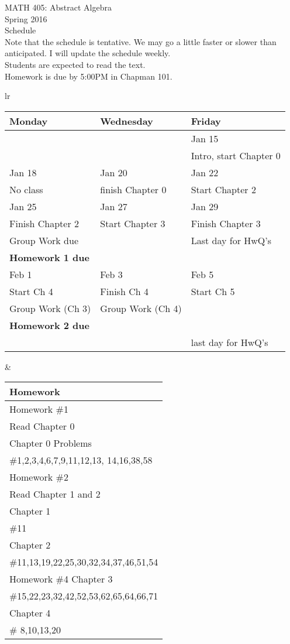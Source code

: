 \documentclass[11pt]{article}
\begin{document}
MATH 405:  Abstract Algebra \\ Spring 2016 \\ Schedule\\

Note that the schedule is tentative. We may go a little faster or slower than anticipated. I will update the schedule weekly.\\

Students are expected to read the text. \\

Homework is due by 5:00PM in Chapman 101.\\

\hrulefill


\begin{tabular}{lr}
\begin{tabular}{|l|l|l|}
\hline
Monday & Wednesday & Friday \\
\hline \hline
&&Jan 15\\
&&Intro, start Chapter 0\\
\hline
Jan 18 & Jan 20 & Jan 22 \\
No class &finish Chapter 0  & Start Chapter 2\\
\hline
Jan 25& Jan 27 & Jan 29 \\
Finish Chapter 2 &Start Chapter 3&Finish Chapter 3\\
Group Work due &&Last day for HwQ's\\
\textbf{Homework 1 due}&&\\
\hline
Feb 1 & Feb 3 & Feb 5 \\
Start Ch 4 & Finish Ch 4& Start Ch 5\\
Group Work (Ch 3)& Group Work (Ch 4) &\\
\textbf{Homework 2 due}&&\\
&& last day for HwQ's\\
\hline
\end{tabular}
&
\begin{tabular}{|p{6cm}|}
\hline
Homework \\
\hline \hline
Homework \#1\\
Read Chapter 0\\
Chapter 0 Problems\\
\#1,2,3,4,6,7,9,11,12,13, 14,16,38,58\\
\hline
Homework \#2\\
Read Chapter 1 and 2\\
Chapter 1\\
\#11\\
Chapter 2\\
\#11,13,19,22,25,30,32,34,37,46,51,54\\
\hline
Homework \#4
Chapter 3\\
\#15,22,23,32,42,52,53,62,65,64,66,71\\
Chapter 4\\
\# 8,10,13,20 \\
\hline
\end{tabular}
\end{tabular}
\end{document}
